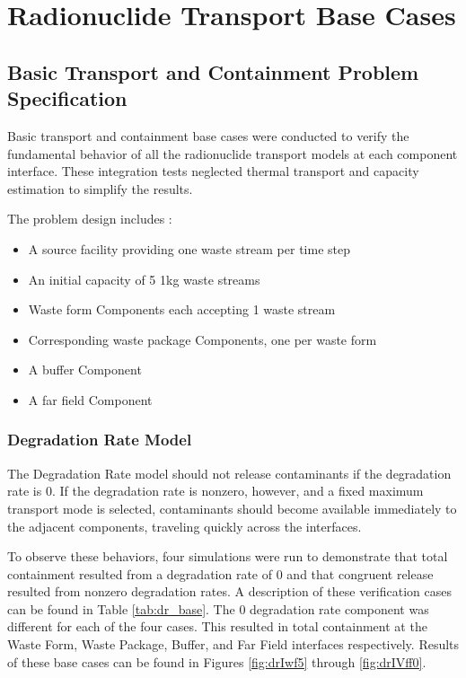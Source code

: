\section{Radionuclide Transport Base Cases}\label{sec:nuclide_base_cases}
\subsection{Basic Transport and Containment Problem Specification}
Basic transport and containment base cases were conducted to verify the 
fundamental behavior of all the radionuclide transport models at each component 
interface. These integration tests neglected thermal transport and capacity 
estimation to simplify the results.  

The problem design includes : 
\begin{itemize}
\item{A source facility providing one waste stream per time step}
\item{An initial capacity of 5 1kg waste streams}
\item{Waste form Components each accepting 1 waste stream} 
\item{Corresponding waste package Components, one per waste form}
\item{A buffer Component}
\item{A far field Component}
\end{itemize}

\subsubsection{Degradation Rate Model}
The Degradation Rate model should not release contaminants if the degradation 
rate is 0. If the degradation rate is nonzero, however, and a fixed maximum 
transport mode is selected, contaminants should become available immediately to 
the adjacent components, traveling quickly across the interfaces. 

To observe these behaviors, four simulations were run to demonstrate that total 
containment resulted from a degradation rate of 0 and that congruent release 
resulted from nonzero degradation rates. A description of these verification 
cases can be found in Table \ref{tab:dr_base}. The 0 degradation rate component was 
different for each of the four cases. This resulted in total containment at the 
Waste Form, Waste Package, Buffer, and Far Field interfaces respectively. 
Results of these base cases can be found in Figures 
\ref{fig:drIwf5} through \ref{fig:drIVff0}.
\FloatBarrier


\FloatBarrier

